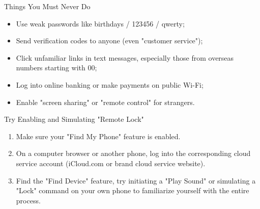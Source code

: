 \begin{tcbwarn}{Things You Must Never Do}
\begin{itemize}
  \item Use weak passwords like birthdays / 123456 / qwerty;
  \item Send verification codes to anyone (even "customer service");
  \item Click unfamiliar links in text messages, especially those from overseas numbers starting with 00;
  \item Log into online banking or make payments on public Wi-Fi;
  \item Enable "screen sharing" or "remote control" for strangers.
\end{itemize}

\end{tcbwarn}

\begin{tcbpractice}{Try Enabling and Simulating "Remote Lock"}
\begin{enumerate}
  \item Make sure your "Find My Phone" feature is enabled.
  \item On a computer browser or another phone, log into the corresponding cloud service account (iCloud.com or brand cloud service website).
  \item Find the "Find Device" feature, try initiating a "Play Sound" or simulating a "Lock" command on your own phone to familiarize yourself with the entire process.
\end{enumerate}

\end{tcbpractice}
